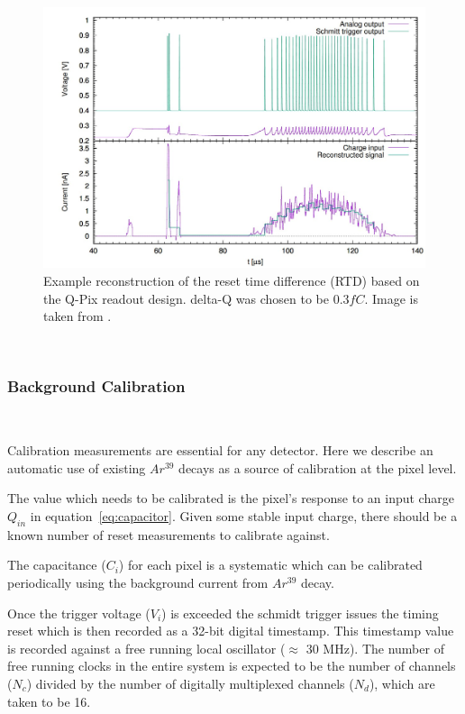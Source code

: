 \begin{figure}[]
\centering
\includegraphics[width=\textwidth]{images/qpix_rtd_reconstruction_example_03fc.jpg}
\caption{Example reconstruction of the reset time difference (RTD) based on the Q-Pix readout design. delta-Q was chosen to be $0.3 fC$. Image is taken from \citep{qpix:nygren:mei}.}
\end{figure}
~\label{fig:qpixRecon2}


\subsubsection{Background Calibration}
~\label{sec:background}

Calibration measurements are essential for any detector.
Here we describe an automatic use of existing $Ar^{39}$ decays as a source of calibration at the pixel level.

The value which needs to be calibrated is the pixel's response to an input charge $Q_{in}$ in equation~\ref{eq:capacitor}.
Given some stable input charge, there should be a known number of reset measurements to calibrate against.

The capacitance ($C_{i}$) for each pixel is a systematic which can be calibrated periodically using the background current from $Ar^{39}$ decay.

Once the trigger voltage ($V_{i}$) is exceeded the schmidt trigger issues the timing reset which is then recorded as a 32-bit digital timestamp.
This timestamp value is recorded against a free running local oscillator ($\approx$ 30 MHz).
The number of free running clocks in the entire system is expected to be the number of channels ($N_{c}$) divided by the number of digitally multiplexed channels ($N_{d}$), which are taken to be 16.

